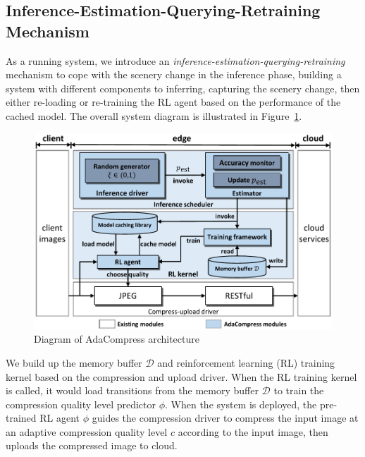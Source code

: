 \subsection{Inference-Estimation-Querying-Retraining Mechanism}

As a running system, we introduce an \emph{inference-estimation-querying-retraining} mechanism to cope with the scenery change in the inference phase, building a system with different components to inferring, capturing the scenery change, then either re-loading or re-training the RL agent based on the performance of the cached model. The overall system diagram is illustrated in Figure~\ref{fig: diagram}.


\begin{figure}[htbp]
    \centerline{\includegraphics[width=0.8\linewidth]{figures/overall-diagram.pdf}}
    \vspace{0.2cm}
    \caption{Diagram of AdaCompress architecture}
    \label{fig: diagram}
\end{figure}

We build up the memory buffer $ \mathcal{D} $ and reinforcement learning (RL) training kernel based on the compression and upload driver. When the RL training kernel is called, it would load transitions from the memory buffer $ \mathcal{D} $ to train the compression quality level predictor $ \phi $. When the system is deployed, the pre-trained RL agent $ \phi $ guides the compression driver to compress the input image at an adaptive compression quality level $ c $ according to the input image, then uploads the compressed image to cloud. %

